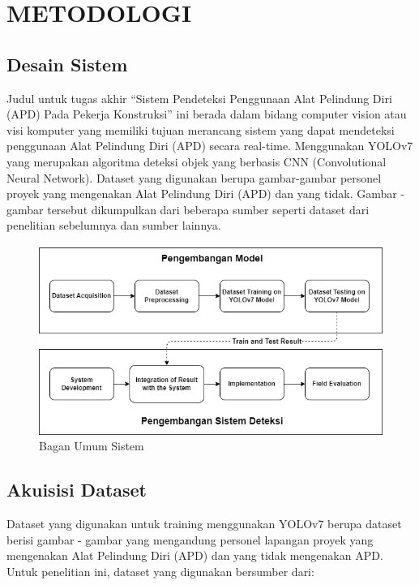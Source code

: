 \chapter{METODOLOGI}


\section{Desain Sistem}
\label{sec:desainsistem}

Judul untuk tugas akhir “Sistem Pendeteksi Penggunaan Alat Pelindung Diri (APD) Pada Pekerja Konstruksi” ini berada dalam bidang computer vision atau visi komputer yang memiliki tujuan merancang sistem yang dapat mendeteksi penggunaan Alat Pelindung Diri (APD) secara real-time. Menggunakan YOLOv7 yang merupakan algoritma deteksi objek yang berbasis CNN (Convolutional Neural Network). Dataset yang digunakan berupa gambar-gambar personel proyek yang mengenakan Alat Pelindung Diri (APD) dan yang tidak. Gambar - gambar tersebut dikumpulkan dari beberapa sumber seperti dataset dari penelitian sebelumnya dan sumber lainnya.

\begin{figure}[ht]
  \centering
  \includegraphics[width=1.0\textwidth]{gambar/desain_sistem.png}
  \caption{Bagan Umum Sistem}
  \label{fig:baganumumsistem}
\end{figure}

\newpage

\section{Akuisisi Dataset}
\label{sec:akuisisidataset}

Dataset yang digunakan untuk training menggunakan YOLOv7 berupa dataset berisi gambar - gambar yang mengandung personel lapangan proyek yang mengenakan Alat Pelindung Diri (APD) dan yang tidak mengenakan APD. Untuk penelitian ini, dataset yang digunakan bersumber dari:

